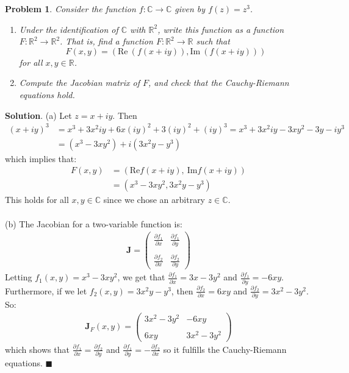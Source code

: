 \documentclass[12pt]{article}
\newcommand{\pd}[2]{\frac{\partial #1}{\partial #2}}
\renewcommand{\=}[1]{\stackrel{#1}{=}} %
\providecommand{\RR}{\mathbb{R}}
\newtheorem{p}{Problem}[section]
\theoremstyle{definition}
\newenvironment{s}{%
        \begin{trivlist} \item \textbf{Solution}. }{%
            \hspace*{\fill} $\blacksquare$\end{trivlist}}%
\begin{document}
\begin{p}
    Consider the function $f: \mathbb{C} \to \mathbb{C}$ given by $f(z) = z^3$.
    \begin{enumerate}
        \item Under the identification of $\mathbb{C}$ with $\mathbb{R}^2$, write this function as a function
            $F: \RR^2 \to \RR^2$. That is, find a function $F: \RR^2\to\RR$ such that 
            \[ F(x,y) = (\text{Re}\:(f(x+iy)),\text{Im}\:(f(x+iy))) \]
            for all $x,y\in\RR$.
        \item Compute the Jacobian matrix of $F$, and check that the Cauchy-Riemann equations hold.
    \end{enumerate}
\end{p}
\begin{s}
    (a) Let $z = x+iy$. Then 
    \begin{align*}
        (x+iy)^3 &= x^3 + 3x^2iy + 6x(iy)^2 + 3(iy)^2 + (iy)^3 = x^3 + 3x^2iy - 3xy^2 - 3y -iy^3 \\
        &= (x^3 - 3xy^2) + i(3x^2y - y^3)
    \end{align*}
    which implies that:
    \begin{align*}
        F(x,y) &= (\text{Re}f(x+iy),\:\text{Im}f(x+iy)) \\
        &= (x^3 - 3xy^2, 3x^2y - y^3)
    \end{align*}
    This holds for all $x,y\in\mathbb{C}$ since we chose an arbitrary $z\in\mathbb{C}$. \\ \\

    (b) The Jacobian for a two-variable function is:
    \begin{align*}
        \mathbf{J} = \begin{pmatrix}
            \pd{f_1}{x} & \pd{f_1}{y} \\ \\
            \pd{f_2}{x} & \pd{f_2}{y}\end{pmatrix}
    \end{align*}
    Letting $f_1(x,y) = x^3-3xy^2$, we get that $\pd{f_1}{x} = 3x-3y^2$ and $\pd{f_1}{y} = -6xy$. Furthermore,
    if we let $f_2(x,y) = 3x^2y - y^3$, then $\pd{f_2}{x} = 6xy$ and $\pd{f_2}{y} = 3x^2-3y^2$. So:
    \begin{align*}
        \mathbf{J}_{F}(x,y) = \begin{pmatrix} 3x^2-3y^2 & -6xy \\ \\ 6xy & 3x^2 - 3y^2 \end{pmatrix}
    \end{align*}
    which shows that $\pd{f_1}{x} = \pd{f_2}{y}$ and $\pd{f_1}{y} = -\pd{f_2}{x}$ so it fulfills the
    Cauchy-Riemann equations.
\end{s}
\end{document}
